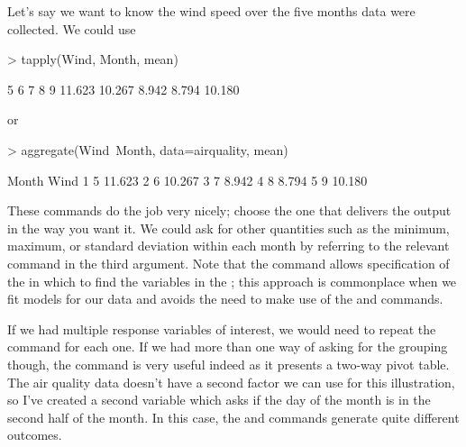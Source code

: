 Let's say we want to know the  wind speed over the five months data were collected. We could use 

\begin{Schunk}
\begin{Sinput}
> tapply(Wind, Month, mean) 
\end{Sinput}
\begin{Soutput}
     5      6      7      8      9 
11.623 10.267  8.942  8.794 10.180 
\end{Soutput}
\end{Schunk}

or

\begin{Schunk}
\begin{Sinput}
> aggregate(Wind~Month, data=airquality, mean) 
\end{Sinput}
\begin{Soutput}
  Month   Wind
1     5 11.623
2     6 10.267
3     7  8.942
4     8  8.794
5     9 10.180
\end{Soutput}
\end{Schunk}

These commands do the job very nicely; choose the one that delivers the output in the way you want it. We could ask for other quantities such as the minimum, maximum, or standard deviation within each month by referring to the relevant \R{} command in the third argument. Note that the  command allows specification of the  in which to find the variables in the ; this approach is commonplace when we fit models for our data and avoids the need to make use of the  and  commands.  
 
If we had multiple response variables of interest, we would need to repeat the command for each one. If we had more than one way of asking for the grouping though, the  command is very useful indeed as it presents a two-way pivot table. The air quality data doesn't have a second factor we can use for this illustration, so I've created a second variable which asks if the day of the month is in the second half of the month. In this case, the  and  commands generate quite different outcomes.

